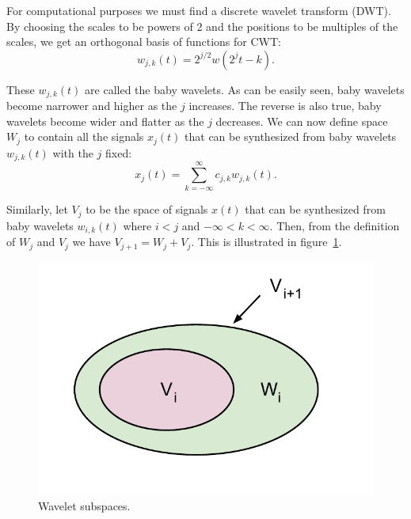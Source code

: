 For computational purposes we must find a discrete wavelet transform (DWT). By choosing the scales to be powers of 2 and the positions to be multiples of the scales, we get an orthogonal basis of functions for CWT:
\begin{equation}
w_{j,k}(t) = 2^{j/2} w(2^j t - k).
\end{equation}

These $w_{j,k}(t)$ are called the baby wavelets. \cite{Phillips03} As can be easily seen, baby wavelets become narrower and higher as the $j$ increases. The reverse is also true, baby wavelets become wider and flatter as the $j$ decreases. We can now define space $W_j$ to contain all the signals $x_j(t)$ that can be synthesized from baby wavelets $w_{j,k}(t)$ with the $j$ fixed:
\begin{equation}
x_j(t) = \sum_{k=-\infty}^{\infty} c_{j,k} w_{j,k}(t).
\end{equation}

Similarly, let $V_j$ to be the space of signals $x(t)$ that can be synthesized from baby wavelets $w_{i,k}(t)$ where $i < j$ and $-\infty < k < \infty$. Then, from the definition of $W_j$ and $V_j$ we have $V_{j+1} = W_j + V_j$. This is illustrated in figure~\ref{fig:wavelet_spaces}.


\begin{figure}[here]
\centering
\includegraphics[scale=0.7]{images/wavelet_spaces.pdf}
\caption{Wavelet subspaces.}
\label{fig:wavelet_spaces}
\end{figure}

